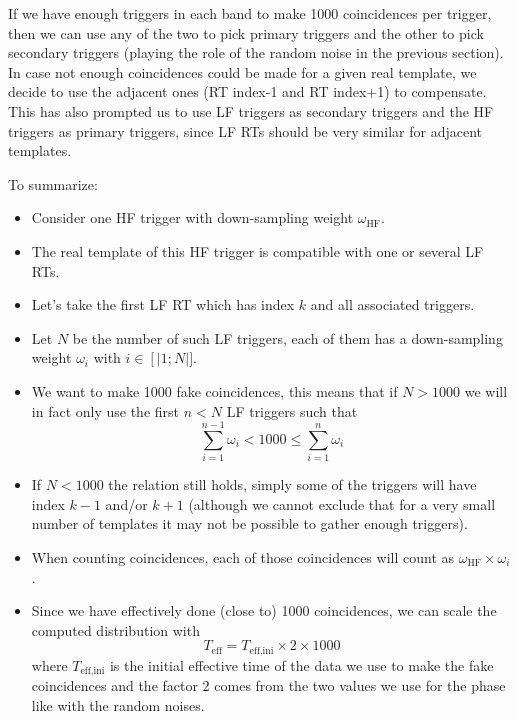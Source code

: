 If we have enough triggers in each band to make 1000 coincidences per trigger, then we can use any of the two to pick primary triggers and the other to pick secondary triggers (playing the role of the random noise in the previous section).
In case not enough coincidences could be made for a given real template, we decide to use the adjacent ones (RT index-1 and RT index+1) to compensate.
This has also prompted us to use LF triggers as secondary triggers and the HF triggers as primary triggers, since LF RTs should be very similar for adjacent templates.

To summarize:
\begin{itemize}
\item Consider one HF trigger with down-sampling weight $\omega_{\textrm{HF}}$.
\item The real template of this HF trigger is compatible with one or several LF RTs.
\item Let's take the first LF RT which has index $k$ and all associated triggers.
\item Let $N$ be the number of such LF triggers, each of them has a down-sampling weight $\omega_i$ with $i\in \left[|1;N\right|]$.
\item We want to make 1000 fake coincidences, this means that if $N>1000$ we will in fact only use the first $n<N$ LF triggers such that
  \begin{equation}
    \sum_{i=1}^{n-1}\omega_i < 1000 \leq \sum_{i=1}^{n}\omega_i
  \end{equation}

\item If $N<1000$ the relation still holds, simply some of the triggers will have index $k-1$ and/or $k+1$ (although we cannot exclude that for a very small number of templates it may not be possible to gather enough triggers).
\item When counting coincidences, each of those coincidences will count as $\omega_{\textrm{HF}} \times \omega_i$.
\item Since we have effectively done (close to) 1000 coincidences, we can scale the computed distribution with
  \begin{equation}
    T_{\textrm{eff}} = T_{\textrm{eff,ini}} \times 2 \times 1000
  \end{equation}
  where $T_{\textrm{eff,ini}}$ is the initial effective time of the data we use to make the fake coincidences and the factor 2 comes from the two values we use for the phase like with the random noises.
\end{itemize}


